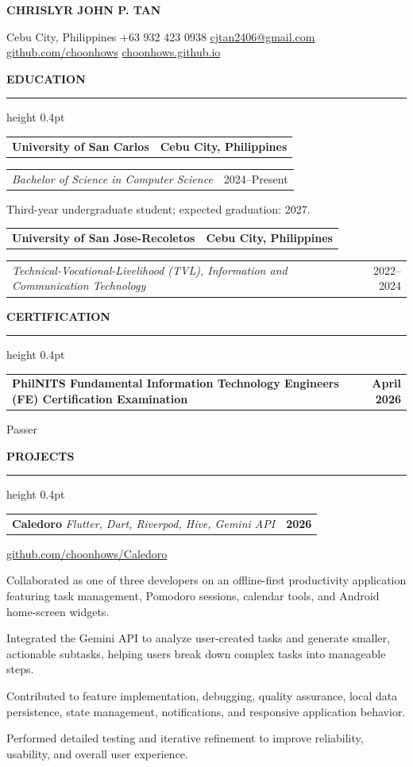 \documentclass[10pt,letterpaper]{article}
\makeatletter
\newenvironment{cvitems}{%
  \begin{list}{\textbullet}{%
    \setlength{\leftmargin}{1.25em}%
    \setlength{\labelsep}{0.45em}%
    \setlength{\itemsep}{0pt}%
    \setlength{\topsep}{1.5pt}%
    \setlength{\parsep}{0pt}%
    \setlength{\partopsep}{0pt}%
  }%
}{\end{list}}
\newcommand{\cvsection}[1]{%
  \vspace{7pt}%
  {\fontsize{12}{13}\selectfont\bfseries\MakeUppercase{#1}}\par
  \vspace{2pt}\hrule height 0.4pt\vspace{4pt}%
}
\newcommand{\headingrow}[2]{%
  \begin{tabularx}{\textwidth}{@{}>{\raggedright\arraybackslash}Xr@{}}
    \textbf{#1} & \textbf{#2}
  \end{tabularx}%
}
\newcommand{\subheadingrow}[2]{%
  \begin{tabularx}{\textwidth}{@{}>{\raggedright\arraybackslash}Xr@{}}
    \textit{#1} & #2
  \end{tabularx}%
}
\newcommand{\projectheading}[3]{%
  \begin{tabularx}{\textwidth}{@{}>{\raggedright\arraybackslash}Xr@{}}
    \textbf{#1} \textbar{} \textit{#2} & \textbf{#3}
  \end{tabularx}%
}
\makeatother
\begin{document}
\begin{center}
  {\fontsize{20}{22}\selectfont\bfseries CHRISLYR JOHN P. TAN}\par
  \vspace{1pt}
  {\fontsize{10}{11}\selectfont
    Cebu City, Philippines \textbar{} +63 932 423 0938 \textbar{}
    \href{mailto:cjtan2406@gmail.com}{cjtan2406@gmail.com} \textbar{}
    \href{https://github.com/choonhows}{github.com/choonhows} \textbar{}
    \href{https://choonhows.github.io}{choonhows.github.io}}
\end{center}
\vspace{-4pt}

\cvsection{Education}
\headingrow{University of San Carlos}{Cebu City, Philippines}
\subheadingrow{Bachelor of Science in Computer Science}{2024--Present}
\begin{cvitems}
  \item Third-year undergraduate student; expected graduation: 2027.
\end{cvitems}
\vspace{1pt}
\headingrow{University of San Jose-Recoletos}{Cebu City, Philippines}
\subheadingrow{Technical-Vocational-Livelihood (TVL), Information and Communication Technology}{2022--2024}

\cvsection{Certification}
\headingrow{PhilNITS Fundamental Information Technology Engineers (FE) Certification Examination}{April 2026}
Passer

\cvsection{Projects}
\projectheading{Caledoro}{Flutter, Dart, Riverpod, Hive, Gemini API}{2026}
\href{https://github.com/choonhows/Caledoro}{github.com/choonhows/Caledoro}
\begin{cvitems}
  \item Collaborated as one of three developers on an offline-first productivity application featuring task management, Pomodoro sessions, calendar tools, and Android home-screen widgets.
  \item Integrated the Gemini API to analyze user-created tasks and generate smaller, actionable subtasks, helping users break down complex tasks into manageable steps.
  \item Contributed to feature implementation, debugging, quality assurance, local data persistence, state management, notifications, and responsive application behavior.
  \item Performed detailed testing and iterative refinement to improve reliability, usability, and overall user experience.
\end{cvitems}
\vspace{2pt}
\end{document}
